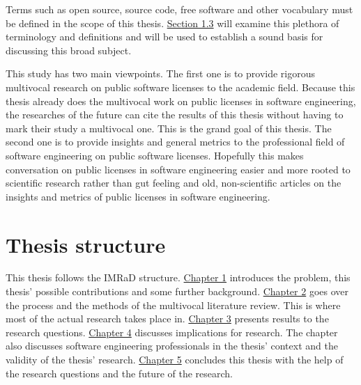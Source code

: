 Terms such as open source, source code, free software and other vocabulary must be defined in the scope of this thesis. \hyperref[sec:bg]{Section 1.3} will examine this plethora of terminology and definitions and will be used to establish a sound basis for discussing this broad subject.

This study has two main viewpoints. The first one is to provide rigorous multivocal research on public software licenses to the academic field. Because this thesis already does the multivocal work on public licenses in software engineering, the researches of the future can cite the results of this thesis without having to mark their study a multivocal one. This is the grand goal of this thesis. The second one is to provide insights and general metrics to the professional field of software engineering on public software licenses. Hopefully this makes conversation on public licenses in software engineering easier and more rooted to scientific research rather than gut feeling and old, non-scientific articles on the insights and metrics of public licenses in software engineering.

\section{Thesis structure}
This thesis follows the IMRaD structure. \hyperref[intro]{Chapter 1} introduces the problem, this thesis' possible contributions and some further background. \hyperref[methods]{Chapter 2} goes over the process and the methods of the multivocal literature review. This is where most of the actual research takes place in. \hyperref[results]{Chapter 3} presents results to the research questions. \hyperref[discussion]{Chapter 4} discusses implications for research. The chapter also discusses software engineering professionals in the thesis' context and the validity of the thesis' research. \hyperref[conclusions]{Chapter 5} concludes this thesis with the help of the research questions and the future of the research.

